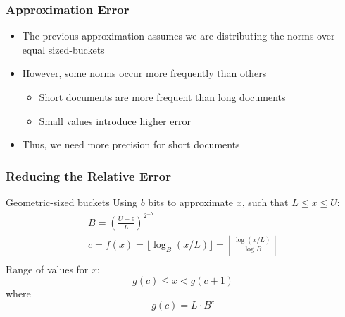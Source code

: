 \documentclass[svgnames]{beamer}
\newcommand{\floor}[1]{\ensuremath{\lfloor #1 \rfloor}}
\begin{document}

\begin{frame} \frametitle{Approximation Error}
  
  \begin{block}{}
    \begin{itemize}
    \item The previous approximation assumes we are distributing the norms over
      equal sized-buckets
    \item However, some norms occur more frequently than others
      \begin{itemize}
      \item Short documents are more frequent than long documents
      \item Small values introduce higher error
      \end{itemize}
    \item Thus, we need more precision for short documents
    \end{itemize}
  \end{block}

\end{frame}


\begin{frame}
  \frametitle{Reducing the Relative Error}
  
  \begin{block}{Geometric-sized buckets}
    Using $b$ bits to approximate $x$, such that $L \leq x \leq U$:
    \begin{displaymath}
      \begin{array}{c}
        B = \left(\frac{U + \epsilon}{L}\right)^{2^{-b}} \\
        c = f(x) = \floor{\log_B(x/L)} = 
        \left\lfloor\frac{\log(x/L)}{\log B}\right\rfloor \\
      \end{array}
    \end{displaymath}
    Range of values for $x$:
    \begin{displaymath}
      g(c) \leq x < g(c+1)
    \end{displaymath}
    where
    \begin{displaymath}
      g(c) = L \cdot B^c
    \end{displaymath}
  \end{block}

\end{frame}
\end{document}
